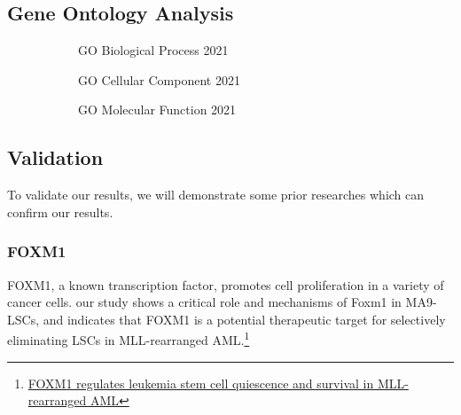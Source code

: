 \documentclass[11pt]{article}
\begin{document}
    \hypertarget{gene-ontology-analysis}{%
\subsection{Gene Ontology Analysis}\label{gene-ontology-analysis}}
\begin{figure}
  \begin{center}
      \begin{subfigure}{.5\textwidth}
          \caption{GO Biological Process 2021}\label{fig:go-bio-pro-2021}
      \end{subfigure}%
      \hspace*{.1in}
      \begin{subfigure}{.5\textwidth}
          \caption{GO Cellular Component 2021}\label{fig:go-cell-comp-2021}
      \end{subfigure}
      \hfill
  \end{center}
  \begin{subfigure}{.5\textwidth}
    \caption{GO Molecular Function 2021}\label{fig:go-mol-func-2021}
  \end{subfigure}
  \hspace*{.1in}
  \begin{subfigure}{.5\textwidth}
  \end{subfigure}
\end{figure}
    \hypertarget{validation}{%
\subsection{Validation}\label{validation}}

To validate our results, we will demonstrate some prior researches which
can confirm our results.

    \hypertarget{foxm1}{%
\subsubsection{FOXM1}\label{foxm1}}

FOXM1, a known transcription factor, promotes cell proliferation in a
variety of cancer cells. our study shows a critical role and mechanisms
of Foxm1 in MA9-LSCs, and indicates that FOXM1 is a potential
therapeutic target for selectively eliminating LSCs in MLL-rearranged
AML.\footnote{\href{https://www.nature.com/articles/s41467-020-14590-9}{FOXM1
  regulates leukemia stem cell quiescence and survival in MLL-rearranged
  AML}}
\end{document}
